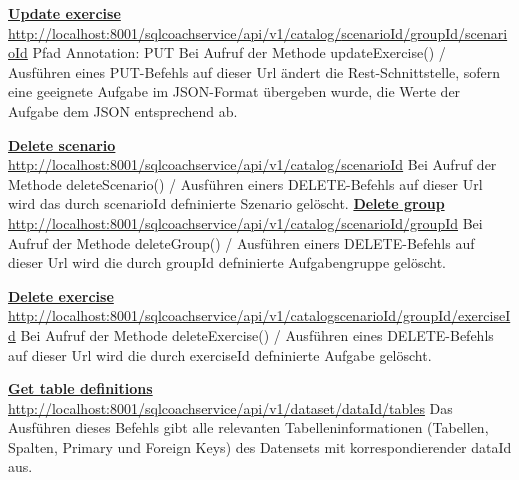 \documentclass[fleqn,10pt,ngerman]{SelfArx}
\begin{document}
	\noindent
	\underline{\textbf{Update exercise}}\newline
	\underline{http://localhost:8001/sqlcoachservice/api/v1/catalog}\newline\underline{/{scenarioId}/{groupId}/scenarioId}\newline
	Pfad Annotation: PUT\newline
		Bei Aufruf der Methode updateExercise() / Ausführen eines PUT-Befehls auf dieser Url ändert die Rest-Schnittstelle, sofern eine geeignete Aufgabe im JSON-Format übergeben wurde, die Werte der Aufgabe dem JSON entsprechend ab.
		\newline\newline
	
	\noindent
	
	\noindent
		\underline{\textbf{Delete scenario}}\newline
	\underline{http://localhost:8001/sqlcoachservice/api/v1/catalog/scenarioId}
	Bei Aufruf der Methode deleteScenario() / Ausführen einers DELETE-Befehls auf dieser Url wird das durch scenarioId defninierte Szenario gelöscht.
		\newline\newline
	\noindent
			\underline{\textbf{Delete group}}\newline
	\underline{http://localhost:8001/sqlcoachservice/api/v1/catalog}\newline\underline{/scenarioId/groupId}\newline
	Bei Aufruf der Methode deleteGroup() / Ausführen einers DELETE-Befehls auf dieser Url wird die durch groupId defninierte Aufgabengruppe gelöscht.
	\newline\newline
	
	\noindent
	\underline{\textbf{Delete exercise}}\newline
	\underline{http://localhost:8001/sqlcoachservice/api/v1/catalog}\newline\underline{scenarioId/groupId/exerciseId}\newline
	Bei Aufruf der Methode deleteExercise() / Ausführen eines DELETE-Befehls auf dieser Url wird die durch exerciseId defninierte Aufgabe gelöscht.
		\newline\newline
	
	\noindent
	\underline{\textbf{Get table definitions}}\newline
	\underline{http://localhost:8001/sqlcoachservice/api/v1}\newline \underline{/dataset/dataId/tables}\newline
	Das Ausführen dieses Befehls gibt alle relevanten Tabelleninformationen (Tabellen, Spalten, Primary und Foreign Keys) des Datensets mit korrespondierender dataId aus.
	\newline\newline
	
\end{document}
